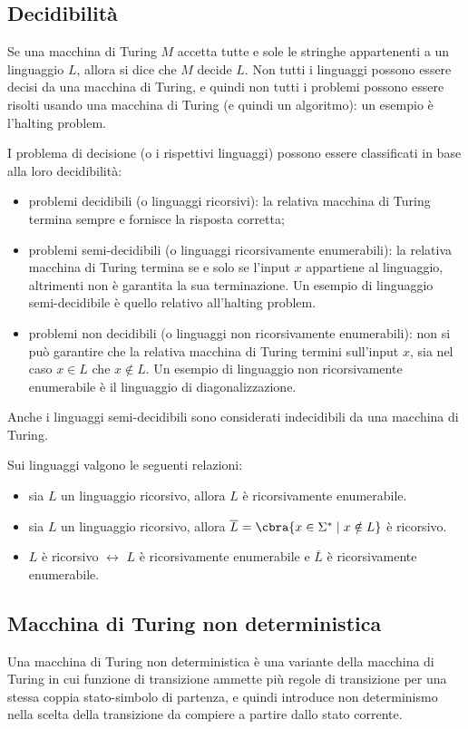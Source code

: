 \subsection{Decidibilità}
Se una macchina di Turing $M$ accetta tutte e sole le stringhe appartenenti
a un linguaggio $L$, allora si dice che $M$ decide $L$.
Non tutti i linguaggi possono essere decisi da una macchina di Turing, e
quindi non tutti i problemi possono essere risolti usando una macchina di
Turing (e quindi un algoritmo): un esempio è l'halting problem.

I problema di decisione (o i rispettivi linguaggi) possono essere
classificati in base alla loro decidibilità:
\begin{itemize}
    \item problemi decidibili (o linguaggi ricorsivi): la relativa macchina
    di Turing termina sempre e fornisce la risposta corretta;
    \item problemi semi-decidibili (o linguaggi ricorsivamente enumerabili):
    la relativa macchina di Turing termina se e solo se l'input $x$ appartiene
    al linguaggio, altrimenti non è garantita la sua terminazione.
    Un esempio di linguaggio semi-decidibile è quello relativo
    all'halting problem.
    \item problemi non decidibili (o linguaggi non ricorsivamente enumerabili):
    non si può garantire che la relativa macchina di Turing termini
    sull'input $x$, sia nel caso $x \in L$ che $x \notin L$.
    Un esempio di linguaggio non ricorsivamente enumerabile è il linguaggio
    di diagonalizzazione.
\end{itemize}
Anche i linguaggi semi-decidibili sono considerati indecidibili da una
macchina di Turing.

Sui linguaggi valgono le seguenti relazioni:
\begin{itemize}
    \item sia $L$ un linguaggio ricorsivo, allora $L$ è ricorsivamente
    enumerabile.
    \item sia $L$ un linguaggio ricorsivo, allora
    $\overline{L} = \cbra{x \in \Sigma^* \; | \; x \notin L}$ è ricorsivo.
    \item $L$ è ricorsivo $\leftrightarrow$ $L$ è ricorsivamente enumerabile
    e $\overline{L}$ è ricorsivamente enumerabile.
\end{itemize}

\subsection{Macchina di Turing non deterministica}
Una macchina di Turing non deterministica è una variante della macchina di
Turing in cui funzione di transizione ammette più regole di transizione per
una stessa coppia stato-simbolo di partenza, e quindi introduce non determinismo
nella scelta della transizione da compiere a partire dallo stato corrente.

